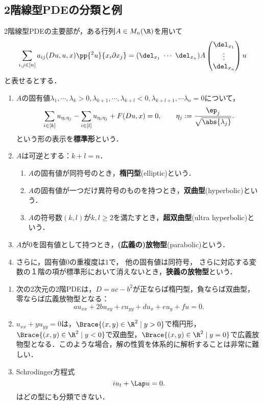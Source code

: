 \documentclass[uplatex,dvipdfmx]{jsreport}
\begin{document}
\subsection{2階線型PDEの分類と例}

\begin{definition}
    2階線型PDEの主要部が，ある行列$A\in M_n(\R)$を用いて
    \[\sum_{i,j\in[n]}a_{ij}(Du,u,x)\pp{^2u}{x_i\partial x_j}=(\del_{x_1}\;\cdots\;\del_{x_n})A \begin{pmatrix}\del_{x_1}\\\vdots\\\del_{x_n}\end{pmatrix}u\]
    と表せるとする．
    \begin{enumerate}
        \item $A$の固有値$\lambda_1,\cdots,\lambda_k>0,\lambda_{k+1},\cdots,\lambda_{k+l}<0,\lambda_{k+l+1},\cdots\lambda_n=0$について，
        \[\sum_{i\in[k]}u_{\eta_i\eta_j}-\sum_{i\in[l]}u_{\eta_i\eta_j}+F(Du,x)=0,\qquad\eta_j:=\frac{\ep_j}{\sqrt{\abs{\lambda_j}}}.\]
        という形の表示を\textbf{標準形}という．
        \item $A$は可逆とする：$k+l=n$．
        \begin{enumerate}
            \item $A$の固有値が同符号のとき，\textbf{楕円型}(elliptic)という．
            \item $A$の固有値が一つだけ異符号のものを持つとき，\textbf{双曲型}(hyperbolic)という．
            \item $A$の符号数$(k,l)$が$k,l\ge 2$を満たすとき，\textbf{超双曲型}(ultra hyperbolic)という．
        \end{enumerate}
        \item $A$が$0$を固有値として持つとき，\textbf{(広義の)放物型}(parabolic)という．
        \item さらに，固有値$0$の重複度は$1$で，
        他の固有値は同符号，
        さらに対応する変数の１階の項が標準形において消えないとき，\textbf{狭義の放物型}という．
    \end{enumerate}
\end{definition}

\begin{example}\mbox{}
    \begin{enumerate}
        \item 次の2次元の2階PDEは，$D=ac-b^2$が正ならば楕円型，負ならば双曲型，零ならば広義放物型となる：
        \[au_{xx}+2bu_{xy}+cu_{yy}+du_x+eu_y+fu=0.\]
        \item $u_{xx}+yu_{yy}=0$は，$\Brace{(x,y)\in\R^2\mid y>0}$で楕円形，$\Brace{(x,y)\in\R^2\mid y<0}$で双曲型，$\Brace{(x,y)\in\R^2\mid y=0}$で広義放物型となる．このような場合，解の性質を体系的に解析することは非常に難しい．
        \item Schrodinger方程式
        \[iu_t+\Lap u=0.\]
        はどの型にも分類できない．
    \end{enumerate}
\end{example}
\end{document}
